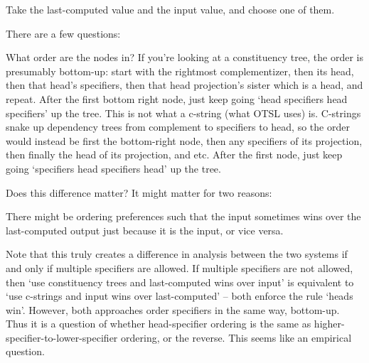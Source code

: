 \ex Take the last-computed value and the input value, and choose one of them. \xe

There are a few questions:

\pex What order are the nodes in?
    \a If you're looking at a constituency tree, the order is presumably bottom-up: start with the rightmost complementizer, then its head, then that head's specifiers, then that head projection's sister which is a head, and repeat. After the first bottom right node, just keep going `head specifiers head specifiers' up the tree.
    \a This is not what a c-string (what OTSL uses) is. C-strings snake up dependency trees from complement to specifiers to head, so the order would instead be first the bottom-right node, then any specifiers of its projection, then finally the head of its projection, and etc. After the first node, just keep going `specifiers head specifiers head' up the tree.
\xe

Does this difference matter? It might matter for two reasons:

\ex There might be ordering preferences such that the input sometimes wins over the last-computed output just because it is the input, or vice versa. \xe

Note that this truly creates a difference in analysis between the two systems if and only if multiple specifiers are allowed. If multiple specifiers are not allowed, then `use constituency trees and last-computed wins over input' is equivalent to `use c-strings and input wins over last-computed' -- both enforce the rule `heads win'. However, both approaches order specifiers in the same way, bottom-up. Thus it is a question of whether head-specifier ordering is the same as higher-specifier-to-lower-specifier ordering, or the reverse. This seems like an empirical question.

